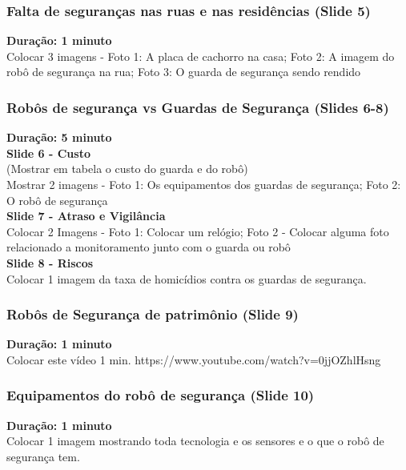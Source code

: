 \documentclass[12pt,a4paper]{article}
\begin{document}
    \subsubsection{Falta de seguranças nas ruas e nas residências (Slide 5)}
    \textbf{Duração: 1 minuto} \\
    Colocar 3 imagens - Foto 1: A placa de cachorro na casa; Foto 2: A imagem do robô de segurança na rua; Foto 3: O guarda de segurança sendo rendido\\ 

    \subsubsection{Robôs de segurança vs Guardas de Segurança (Slides 6-8)}
    \textbf{Duração: 5 minuto} \\
    \textbf{Slide 6 - Custo} \\
    (Mostrar em tabela o custo do guarda e do robô) \\
    Mostrar 2 imagens - Foto 1: Os equipamentos dos guardas de segurança; Foto 2: O robô de segurança \\
    \textbf{Slide 7 - Atraso e Vigilância} \\
    Colocar 2 Imagens - Foto 1: Colocar um relógio; Foto 2 - Colocar alguma foto relacionado a monitoramento junto com o guarda ou robô \\
    \textbf{Slide 8 - Riscos} \\
    Colocar 1 imagem da taxa de homicídios contra os guardas de segurança. \\

    \subsubsection{Robôs de Segurança de patrimônio (Slide 9)}
    \textbf{Duração: 1 minuto} \\
    Colocar este vídeo 1 min. https://www.youtube.com/watch?v=0jjOZhlHsng \\

    \subsubsection{Equipamentos do robô de segurança (Slide 10)}
    \textbf{Duração: 1 minuto} \\
    Colocar 1 imagem mostrando toda tecnologia e os sensores e o que o robô de segurança tem. \\
    
\end{document}
